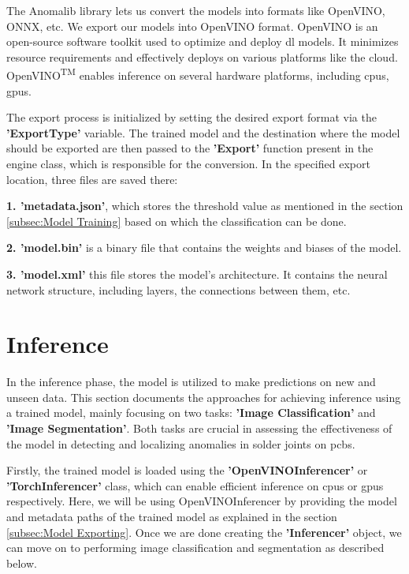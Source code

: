 The Anomalib library lets us convert the models into formats like OpenVINO, ONNX, etc. We export our models into OpenVINO format. OpenVINO is an open-source software toolkit used to optimize and deploy \gls{dl} models. It minimizes resource requirements and effectively deploys on various platforms like the cloud. OpenVINO\textsuperscript{TM} enables inference on several hardware platforms, including \glspl{cpu}, \glspl{gpu}.\cite{openvino2024}

The export process is initialized by setting the desired export format via the \textbf{'ExportType'} variable. The trained model and the destination where the model should be exported are then passed to the \textbf{'Export'} function present in the engine class, which is responsible for the conversion. In the specified export location, three files are saved there:

\textbf{1. 'metadata.json'}, which stores the threshold value as mentioned in the section \ref{subsec:Model Training} based on which the classification can be done.

\textbf{2. 'model.bin'} is a binary file that contains the weights and biases of the model.

\textbf{3. 'model.xml'} this file stores the model's architecture. It contains the neural network structure, including layers, the connections between them, etc.

\section{Inference}
\label{subsec:Inference}

In the inference phase, the model is utilized to make predictions on new and unseen data. This section documents the approaches for achieving inference using a trained model, mainly focusing on two tasks: \textbf{'Image Classification'} and \textbf{'Image Segmentation'}. Both tasks are crucial in assessing the effectiveness of the model in detecting and localizing anomalies in solder joints on \glspl{pcb}.

Firstly, the trained model is loaded using the \textbf{'OpenVINOInferencer'} or \textbf{'TorchInferencer'} class, which can enable efficient inference on \glspl{cpu} or \glspl{gpu} respectively. Here, we will be using OpenVINOInferencer by providing the model and metadata paths of the trained model as explained in the section \ref{subsec:Model Exporting}. Once we are done creating the \textbf{'Inferencer'} object, we can move on to performing image classification and segmentation as described below.

